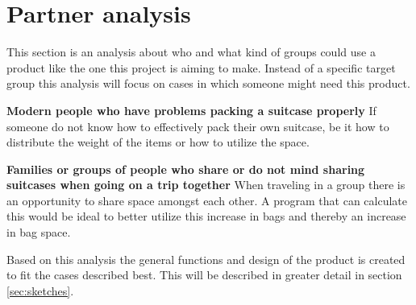 \section{Partner analysis}
This section is an analysis about who and what kind of groups could use a product like the one this project is aiming to make.
Instead of a specific target group this analysis will focus on cases in which someone might need this product.

\textbf{Modern people who have problems packing a suitcase properly}
If someone do not know how to effectively pack their own suitcase, be it how to distribute the weight of the items or how to utilize the space.

\textbf{Families or groups of people who share or do not mind sharing suitcases when going on a trip together}
When traveling in a group there is an opportunity to share space amongst each other. A program that can calculate this would be ideal to better utilize this increase in bags and thereby an increase in bag space. 

Based on this analysis the general functions and design of the product is created to fit the cases described best. This will be described in greater detail in section \ref{sec:sketches}.
